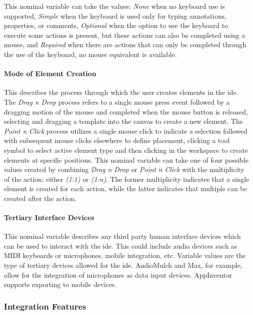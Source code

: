 This nominal variable can take the values:
\textsl{None} when no keyboard use is supported,
\textsl{Simple} when the keyboard is used only for typing annotations, properties, or comments,
\textsl{Optional} when the option to use the keyboard to execute some actions is present, but these actions can also be completed using a mouse,
and \textsl{Required} when there are actions that can only be completed through the use of the keyboard, no mouse equivalent is available.


\paragraph{Mode of Element Creation}
This describes the process through which the user creates elements in the
\ac{ide}. The \emph{Drag n Drop} process refers to a single mouse press
event followed by a dragging motion of the mouse and completed when the
mouse button is released, \eg selecting and dragging a template into the
canvas to create a new element. The \emph{Point n Click} process utilizes
a single mouse click to indicate a selection followed with subsequent mouse
clicks elsewhere to define placement, \eg clicking a tool symbol to select
active element type and then clicking in the workspace to create elements
at specific positions. This nominal variable can take one of four possible
values created by combining \textsl{Drag n Drop} or \textsl{Point n Click}
with the multiplicity of the action: either \textsl{(1:1)} or
\textsl{(1:n)}. The former multiplicity indicates that a single element is
created for each action, while the latter indicates that multiple can be
created after the action.


\paragraph{Tertiary Interface Devices}
This nominal variable describes any
third party human interface devices which can be used to interact with the
\ac{ide}. This could include audio devices such as MIDI keyboards or
microphones, mobile integration, etc. Variable values are the type of
tertiary devices allowed for the \ac{ide}. AudioMulch and Max, for example,
allow for the integration of microphones as data input devices. AppInventor
supports exporting to mobile devices.


\subsubsection{Integration Features} \label{subsubsec:integration}

